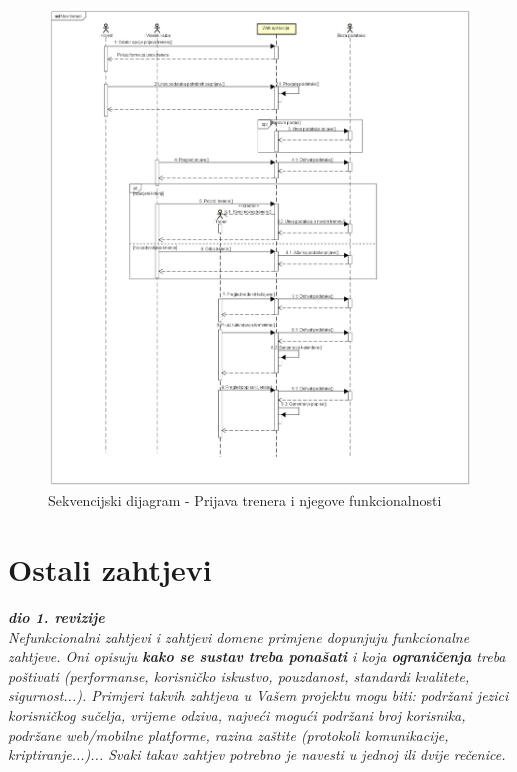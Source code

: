 		\begin{figure}[H]
			\includegraphics[scale=0.4]{slike/SD-prijavaTrenera.PNG} %
			\centering
			\caption{Sekvencijski dijagram - Prijava trenera i njegove funkcionalnosti}
			\label{fig:trener}
		\end{figure}
		
				

				\eject
	
		\section{Ostali zahtjevi}
		
			\textbf{\textit{dio 1. revizije}}\\
		 
			 \textit{Nefunkcionalni zahtjevi i zahtjevi domene primjene dopunjuju funkcionalne zahtjeve. Oni opisuju \textbf{kako se sustav treba ponašati} i koja \textbf{ograničenja} treba poštivati (performanse, korisničko iskustvo, pouzdanost, standardi kvalitete, sigurnost...). Primjeri takvih zahtjeva u Vašem projektu mogu biti: podržani jezici korisničkog sučelja, vrijeme odziva, najveći mogući podržani broj korisnika, podržane web/mobilne platforme, razina zaštite (protokoli komunikacije, kriptiranje...)... Svaki takav zahtjev potrebno je navesti u jednoj ili dvije rečenice.}
			 
			 
			 
	
